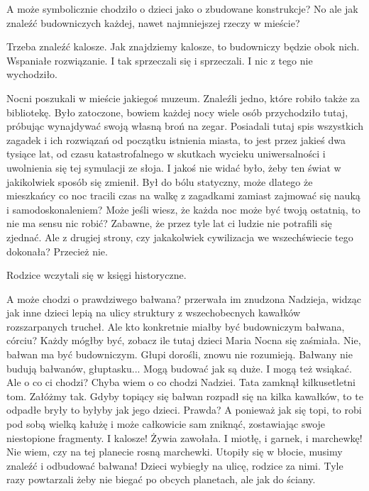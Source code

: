 A może symbolicznie chodziło o dzieci jako o zbudowane konstrukcje? 
No ale jak znaleźć budowniczych każdej, nawet najmniejszej rzeczy w mieście?

Trzeba znaleźć kalosze. Jak znajdziemy kalosze, to budowniczy będzie obok nich. Wspaniałe rozwiązanie.
I tak sprzeczali się i sprzeczali.
I nic z tego nie wychodziło.


Nocni poszukali w mieście jakiegoś muzeum.
Znaleźli jedno, które robiło także za bibliotekę.
Było zatoczone, bowiem każdej nocy wiele osób przychodziło tutaj, próbując wynajdywać swoją własną broń na zegar.
Posiadali tutaj spis wszystkich zagadek i ich rozwiązań od początku istnienia miasta, to jest przez jakieś dwa tysiące lat, od czasu katastrofalnego w skutkach wycieku uniwersalności i uwolnienia się tej symulacji ze słoja.
I jakoś nie widać było, żeby ten świat w jakikolwiek sposób się zmienił. 
Był do bólu statyczny, może dlatego że mieszkańcy co noc tracili czas na walkę z zagadkami zamiast zajmować się nauką i samodoskonaleniem?
Może jeśli wiesz, że każda noc może być twoją ostatnią, to nie ma sensu nic robić?
Zabawne, że przez tyle lat ci ludzie nie potrafili się zjednać.
Ale z drugiej strony, czy jakakolwiek cywilizacja we wszechświecie tego dokonała? Przecież nie.

Rodzice wczytali się w księgi historyczne.
\begin{dialogue}
	\ds{} A może chodzi o prawdziwego bałwana? \dm{} przerwała im znudzona Nadzieja, widząc jak inne dzieci lepią na ulicy struktury z wszechobecnych kawałków rozszarpanych trucheł.
	\ds{} Ale kto konkretnie miałby być budowniczym bałwana, córciu? Każdy mógłby być, zobacz ile tutaj dzieci \dm{} Maria Nocna się zaśmiała.
	\ds{} Nie, bałwan ma być budowniczym.
		\dm{} Głupi dorośli, znowu nie rozumieją.
	\ds{} Bałwany nie budują bałwanów, głuptasku...
	\ds{} Mogą budować jak są duże. I mogą też wsiąkać.
	\ds{} Ale o co ci chodzi?
	\ds{} Chyba wiem o co chodzi Nadziei. 
		\dm{} Tata zamknął kilkusetletni tom. 
		\dm{} Załóżmy tak. Gdyby topiący się bałwan rozpadł się na kilka kawałków, to te odpadłe bryły to byłyby jak jego dzieci. Prawda? A ponieważ jak się topi, to robi pod sobą wielką kałużę i może całkowicie sam zniknąć, zostawiając swoje niestopione fragmenty.
	\ds{} I kalosze! \dm{} Żywia zawołała. \dm{} I miotłę, i garnek, i marchewkę!
	\ds{} Nie wiem, czy na tej planecie rosną marchewki.
	\ds{} Utopiły się w błocie, musimy znaleźć i odbudować bałwana! \dm{} Dzieci wybiegły na ulicę, rodzice za nimi. Tyle razy powtarzali żeby nie biegać po obcych planetach, ale jak do ściany.
\end{dialogue}

